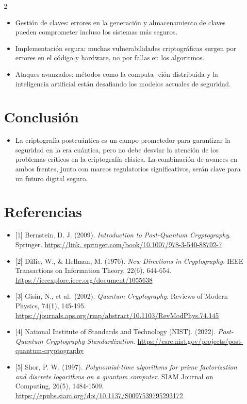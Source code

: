\documentclass[12pt,spanish,Letterpaper,openany]{book}
\providecommand{\tightlist}{%
  \setlength{\itemsep}{0pt}\setlength{\parskip}{0pt}}
\begin{document}
\begin {multicols}{2}
\begin{itemize}
\item
  Gestión de claves: errores en la generación y almacenamiento de claves pueden comprometer incluso los sistemas más seguros.
\item
  Implementación segura: muchas vulnerabilidades criptográficas surgen por errores en el código y hardware, no por fallas en los algoritmos.
\item
  Ataques avanzados: métodos como la computa-
  ción distribuida y la inteligencia artificial están desafiando los modelos actuales de seguridad.
\end{itemize}

\hypertarget{conclusiuxf3n-1}{%
\section{Conclusión}\label{conclusiuxf3n-1}}

\begin{itemize}
\tightlist
\item
  La criptografía postcuántica es un campo prometedor para garantizar la seguridad en la era cuántica, pero no debe desviar la atención de los problemas críticos en la criptografía clásica. La combinación de avances en ambos frentes, junto con marcos regulatorios significativos, serán clave para un futuro digital seguro.
\end{itemize}

\hypertarget{referencias-7}{%
\section{Referencias}\label{referencias-7}}

\begin{itemize}
\item
  {[}1{]} Bernstein, D. J. (2009). \emph{Introduction to Post-Quantum Cryptography}. Springer. \href{https://link.springer.com/book/10.1007/978-3-540-88702-7}{https://link.
  springer.com/book/10.1007/978-3-540-88702-7}
\item
  {[}2{]} Diffie, W., \& Hellman, M. (1976). \emph{New Directions in Cryptography}. IEEE Transactions on Information Theory, 22(6), 644-654. \url{https://ieeexplore.ieee.org/document/1055638}
\item
  {[}3{]} Gisin, N., et al.~(2002). \emph{Quantum Cryptography}. Reviews of Modern Physics, 74(1), 145-195.
  \url{https://journals.aps.org/rmp/abstract/10.1103/RevModPhys.74.145}
\item
  {[}4{]} National Institute of Standards and Technology (NIST). (2022). \emph{Post-Quantum Cryptography Standardization}.
  \url{https://csrc.nist.gov/projects/post-quantum-cryptography}
\item
  {[}5{]} Shor, P. W. (1997). \emph{Polynomial-time algorithms for prime factorization and discrete logarithms on a quantum computer}. SIAM Journal on Computing, 26(5), 1484-1509. \url{https://epubs.siam.org/doi/10.1137/S0097539795293172}
\end{itemize}

\end {multicols}
\end{document}
